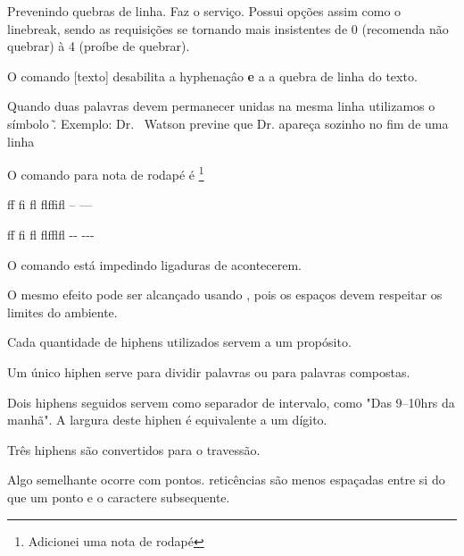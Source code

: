\documentclass{article}
\begin{document}
Prevenindo quebras de linha.
\nolinebreak Faz o serviço.
Possui opções assim como o linebreak, sendo as requisições 
se tornando mais insistentes de 0 (recomenda não quebrar)
à 4 (proíbe de quebrar).

O comando \mbox[texto] desabilita a hyphenaçâo \textbf{e} a 
a quebra de linha do texto.

Quando duas palavras devem permanecer unidas na mesma linha utilizamos o símbolo \~.
Exemplo:
Dr. ~Watson previne que Dr. apareça sozinho no fim de uma linha

O comando para nota de rodapé é \footnote{Adicionei uma nota de rodapé}


ff fi fl flffifl -- ---

f\/f f\/i f\/l f\/l\/f\/f\/l\/f\/l -\/- -\/-\/-

O comando \/ está impedindo ligaduras de acontecerem.

O mesmo efeito pode ser alcançado usando {},
pois os espaços devem respeitar os limites do ambiente.

Cada quantidade de hiphens utilizados servem a um propósito.

Um único hiphen serve para dividir palavras ou para palavras compostas.

Dois hiphens seguidos servem como separador de intervalo, como
"Das 9--10hrs da manhã".
A largura deste hiphen é equivalente a um dígito.

Três hiphens são convertidos para o travessão.

Algo semelhante ocorre com pontos.
reticências são menos espaçadas entre si do que um ponto 
e o caractere subsequente.
\end{document}
